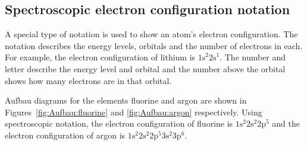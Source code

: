 \subsection*{Spectroscopic electron configuration notation}
        \label{m38741*id259749}A special type of notation is used to show an atom's electron configuration. The notation describes the energy levels, orbitals and the number of electrons in each. For example, the electron configuration of lithium is ${1\text{s}}^{2}{2\text{s}}^{1}$. The number and letter describe the energy level and orbital and the number above the orbital shows how many electrons are in that orbital. 

Aufbau diagrams for the elements fluorine and argon are shown in Figures~\ref{fig:Aufbau:fluorine} and \ref{fig:Aufbau:argon} respectively. Using spectroscopic notation, the electron configuration of fluorine is $1\text{s}^{2}{2}\text{s}^{2}2\text{p}^{5}$ and the electron configuration of argon is $1\text{s}^{2}{2}\text{s}^{2}2\text{p}^{5}{3}\text{s}^{2}3\text{p}^{6}$. \\
